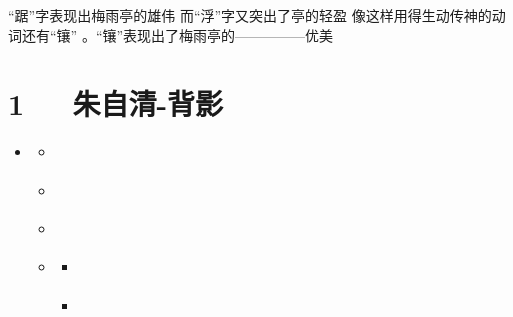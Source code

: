 \documentclass[letterpaper,12pt,english]{sphinxmanual}
\begin{document}
“踞”字表现出梅雨亭的雄伟 而“浮”字又突出了亭的轻盈
像这样用得生动传神的动词还有“镶” 。“镶”表现出了梅雨亭的—————优美


\chapter{1   朱自清-背影}
\label{\detokenize{p01_u6563_u6587/_u6731_u81ea_u6e05-_u80cc_u5f71:id1}}\label{\detokenize{p01_u6563_u6587/_u6731_u81ea_u6e05-_u80cc_u5f71::doc}}
\begin{sphinxShadowBox}
\begin{itemize}
\item {} 
\label{\detokenize{p01_u6563_u6587/_u6731_u81ea_u6e05-_u80cc_u5f71:id14}}{\hyperref[\detokenize{p01_u6563_u6587/_u6731_u81ea_u6e05-_u80cc_u5f71:id1}]{}}
\begin{itemize}
\item {} 
\label{\detokenize{p01_u6563_u6587/_u6731_u81ea_u6e05-_u80cc_u5f71:id15}}{\hyperref[\detokenize{p01_u6563_u6587/_u6731_u81ea_u6e05-_u80cc_u5f71:id3}]{}}

\item {} 
\label{\detokenize{p01_u6563_u6587/_u6731_u81ea_u6e05-_u80cc_u5f71:id16}}{\hyperref[\detokenize{p01_u6563_u6587/_u6731_u81ea_u6e05-_u80cc_u5f71:id4}]{}}

\item {} 
\label{\detokenize{p01_u6563_u6587/_u6731_u81ea_u6e05-_u80cc_u5f71:id17}}{\hyperref[\detokenize{p01_u6563_u6587/_u6731_u81ea_u6e05-_u80cc_u5f71:id5}]{}}

\item {} 
\label{\detokenize{p01_u6563_u6587/_u6731_u81ea_u6e05-_u80cc_u5f71:id18}}{\hyperref[\detokenize{p01_u6563_u6587/_u6731_u81ea_u6e05-_u80cc_u5f71:id6}]{}}
\begin{itemize}
\item {} 
\label{\detokenize{p01_u6563_u6587/_u6731_u81ea_u6e05-_u80cc_u5f71:id19}}{\hyperref[\detokenize{p01_u6563_u6587/_u6731_u81ea_u6e05-_u80cc_u5f71:id7}]{}}

\item {} 
\label{\detokenize{p01_u6563_u6587/_u6731_u81ea_u6e05-_u80cc_u5f71:id20}}{\hyperref[\detokenize{p01_u6563_u6587/_u6731_u81ea_u6e05-_u80cc_u5f71:id8}]{}}


\end{itemize}
\end{itemize}
\end{itemize}
\end{sphinxShadowBox}
\end{document}
